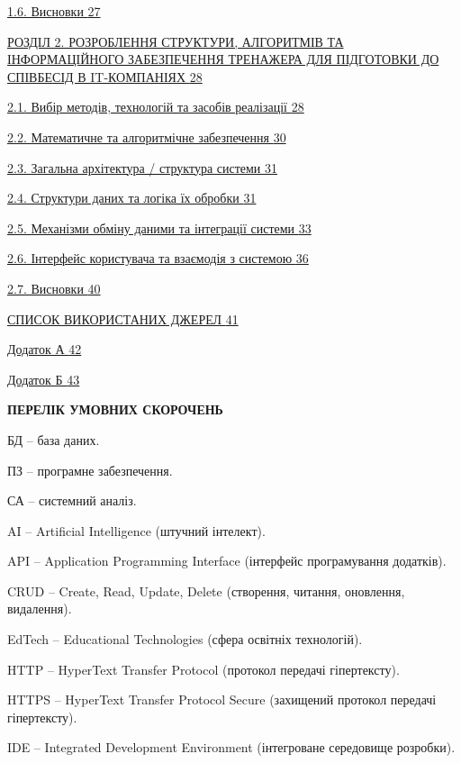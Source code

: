 \hyperref[_Toc228981057]{1.6. Висновки \hyperref[_Toc228981057]{27}}

\hyperref[_Toc228981058]{РОЗДІЛ 2. РОЗРОБЛЕННЯ СТРУКТУРИ, АЛГОРИТМІВ ТА
ІНФОРМАЦІЙНОГО ЗАБЕЗПЕЧЕННЯ ТРЕНАЖЕРА ДЛЯ ПІДГОТОВКИ ДО СПІВБЕСІД В
IT-КОМПАНІЯХ \hyperref[_Toc228981058]{28}}

\hyperref[_Toc228981059]{2.1. Вибір методів, технологій та засобів
реалізації \hyperref[_Toc228981059]{28}}

\hyperref[_Toc228981060]{2.2. Математичне та алгоритмічне забезпечення
\hyperref[_Toc228981060]{30}}

\hyperref[_Toc228981061]{2.3. Загальна архітектура / структура системи
\hyperref[_Toc228981061]{31}}

\hyperref[_Toc228981062]{2.4. Структури даних та логіка їх обробки
\hyperref[_Toc228981062]{31}}

\hyperref[_Toc228981063]{2.5. Механізми обміну даними та інтеграції
системи \hyperref[_Toc228981063]{33}}

\hyperref[_Toc228981064]{2.6. Інтерфейс користувача та взаємодія з
системою \hyperref[_Toc228981064]{36}}

\hyperref[_Toc228981065]{2.7. Висновки \hyperref[_Toc228981065]{40}}

\hyperref[_Toc228981066]{СПИСОК ВИКОРИСТАНИХ ДЖЕРЕЛ
\hyperref[_Toc228981066]{41}}

\hyperref[_Toc228981067]{Додаток А \hyperref[_Toc228981067]{42}}

\hyperref[_Toc228981068]{Додаток Б \hyperref[_Toc228981068]{43}}

\textbf{ПЕРЕЛІК УМОВНИХ СКОРОЧЕНЬ}

БД -- база даних.

ПЗ -- програмне забезпечення.

СА -- системний аналіз.

AI -- Artificial Intelligence (штучний інтелект).

API -- Application Programming Interface (інтерфейс програмування
додатків).

CRUD -- Create, Read, Update, Delete (створення, читання, оновлення,
видалення).

EdTech -- Educational Technologies (сфера освітніх технологій).

HTTP -- HyperText Transfer Protocol (протокол передачі гіпертексту).

HTTPS -- HyperText Transfer Protocol Secure (захищений протокол передачі
гіпертексту).

IDE -- Integrated Development Environment (інтегроване середовище
розробки).

